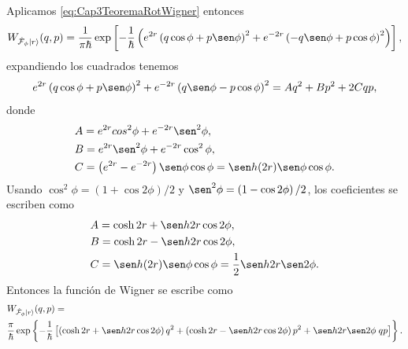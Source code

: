                     Aplicamos \ref{eq:Cap3TeoremaRotWigner} entonces
                    \begin{equation}
                        W_{\hat{\mathcal{F}}_\phi \ket{r}}(q,p) = \frac{1}{\pi\hbar}\exp\left[- \frac{1}{\hbar}\left( e^{2r}\left(q\cos\phi + p \sen\phi\right)^2 + e^{-2r}\left(-q\sen\phi + p \cos\phi \right)^2 \right) \right],
                    \end{equation}
                    expandiendo los cuadrados tenemos
                    \begin{equation*}
                        e^{2r} \left(q\cos\phi + p\sen\phi \right)^2 + e^{-2r} \left(q\sen\phi - p\cos\phi\right)^2  = Aq^2 + Bp^2 + 2C qp,
                    \end{equation*}
                    donde
                    \begin{align*}
                        & A = e^{2r}cos^2\phi + e^{-2r}\sen^2\phi, \\
                        & B = e^{2r}\sen^2\phi + e^{-2r}\cos^2\phi,\\
                        & C = \left(e^{2r} - e^{-2r}\right)\sen\phi \cos\phi = \sen h(2r)\sen\phi \cos\phi.
                    \end{align*}
                    Usando $\cos^2\phi = \left(1+\cos 2\phi\right)/2$ y $\sen^2\phi = \left(1- \cos 2\phi\right)/2$, los coeficientes se escriben como
                    \begin{align*}
                        & A = \cosh 2r + \sen h2r \cos 2\phi,\\
                        & B = \cosh 2r - \sen h2r \cos 2\phi,\\
                        & C = \sen h(2r)\sen\phi\cos\phi = \frac{1}{2}\sen h2r \sen 2\phi.
                    \end{align*}
                    Entonces la función de Wigner se escribe como
                    \begin{align}
                        & W_{\hat{\mathcal{F}}_\phi \ket{r}}(q,p) = \nonumber\\
                        &\frac{\pi}{\hbar} \exp\left\{-\frac{1}{\hbar} \left[ \left(\cosh 2r + \sen h 2r \cos 2\phi \right)q^2 + \left( \cosh 2r - \sen h2r \cos 2\phi \right)p^2 + \sen h2r \sen 2\phi\;qp \right]\right\}.
                    \end{align}

